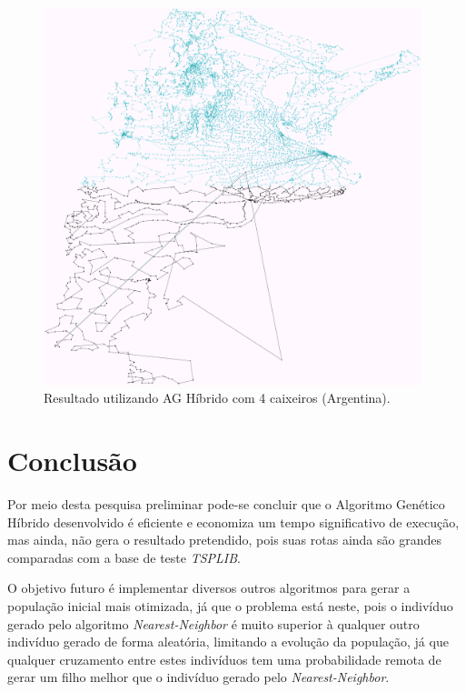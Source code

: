 \documentclass{abnt}
\begin{document}
	   	\begin{figure}[h]
				\centering
		        \includegraphics[width = 11cm,keepaspectratio]{img/output-nn-4}
		        \caption{Resultado utilizando AG Híbrido com 4 caixeiros (Argentina).}
		        \label{tgan4}
	   	\end{figure}
		
		\chapter{Conclusão}
		
	 Por meio desta pesquisa preliminar pode-se concluir que o Algoritmo Genético Híbrido desenvolvido é eficiente e economiza um tempo significativo de execução, mas ainda, não gera o resultado pretendido, pois suas rotas ainda são grandes comparadas com a base de teste \textit{TSPLIB}.
	 
	 O objetivo futuro é implementar diversos outros algoritmos para gerar a população inicial mais otimizada, já que o problema está neste, pois o indivíduo gerado pelo algoritmo \textit{Nearest-Neighbor} é muito superior à qualquer outro indivíduo gerado de forma aleatória, limitando a evolução da população, já que qualquer cruzamento entre estes indivíduos tem uma probabilidade remota de gerar um filho melhor que o indivíduo gerado pelo \textit{Nearest-Neighbor}.

	
\end{document}
